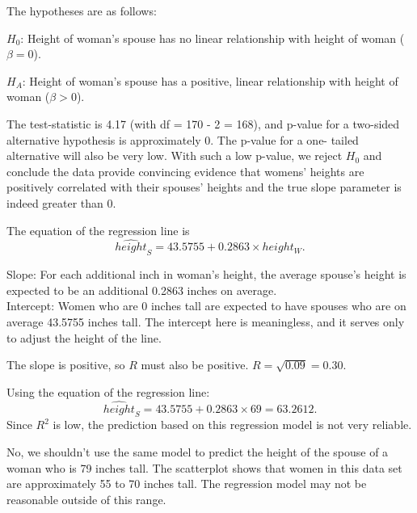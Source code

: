 \begin{parts}
\item The hypotheses are as follows:
\begin{hyp}
\item[] $H_0$: Height of woman's spouse has no linear relationship with height of woman
($\beta = 0$).
\item[] $H_A$: Height of woman's spouse has a positive, linear relationship with height of woman
 ($\beta > 0$).
\end{hyp}
The test-statistic is 4.17 (with df = 170 - 2 = 168), and p-value for a 
two-sided alternative hypothesis is approximately 0. The p-value for a one-
tailed alternative will also be very low. With such a low p-value, we 
reject $H_0$ and conclude the data provide convincing evidence that womens' 
heights are positively correlated with their spouses' heights and the true slope 
parameter is indeed greater than 0.
\item The equation of the regression line is
\[ \widehat{height}_{S} = 43.5755 + 0.2863 \times height_{W}. \]
\item Slope: For each additional inch in woman's height, the average 
spouse's height is expected to be an additional 0.2863 inches on average. \\
Intercept: Women who are 0 inches tall are expected to have spouses who are on 
average 43.5755 inches tall. The intercept here is meaningless, and it 
serves only to adjust the height of the line.
\item The slope is positive, so $R$ must also be positive. 
$R = \sqrt{0.09} = 0.30$.
\item Using the equation of the regression line: \\
\[ \widehat{height}_{S} = 43.5755 + 0.2863 \times 69 = 63.2612. \]
Since $R^2$ is low, the prediction based on this regression model is not 
very reliable.
\item No, we shouldn't use the same model to predict the height of the 
spouse of a woman who is 79 inches tall. The scatterplot shows that women 
in this data set are approximately 55 to 70 inches tall. The regression 
model may not be reasonable outside of this range.
\end{parts}

